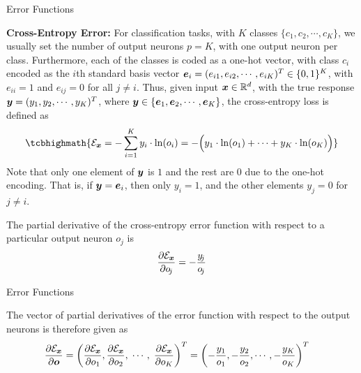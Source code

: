 \begin{frame}{Error Functions}

    {\bf Cross-Entropy Error:} For classification tasks, with $K$
        classes $\{c_1, c_2, \cdots, c_K\}$, we usually set the number
        of output neurons $p=K$, with one output neuron 
        per class. Furthermore, each of
        the classes is coded as a one-hot vector, with class $c_i$
        encoded as the $i$th standard basis vector 
        ${\boldsymbol e}_i  = (e_{i1}, e_{i2}, \cdots, e_{iK})^T \in \{0,1\}^{K}$,
        with $e_{ii}=1$ and $e_{ij} = 0$ for all $j\ne i$. Thus,
        given input ${\boldsymbol x} \in {\mathord{\mathbb R}}^d$, with 
        the true response ${\boldsymbol y} = (y_1,
        y_2, \cdots, y_K)^T$, where ${\boldsymbol y} \in \{{\boldsymbol e}_1, {\boldsymbol e}_2,
        \cdots, {\boldsymbol e}_K\}$, the cross-entropy loss is defined as 
\begin{align}
    \tcbhighmath{
    \cE_\bx = - \sum_{i=1}^K y_i \cdot \ln(o_i) = 
    - \Bigl( y_1 \cdot \ln(o_1) + \cdots 
+ y_K \cdot \ln(o_K) \Bigr) }
            \label{eq:reg:neural:CE}
\end{align}
Note that only one element of ${\boldsymbol y}$ is $1$ and the rest are $0$
due to the one-hot encoding. That is, if ${\boldsymbol y} = {\boldsymbol e}_i$, then only $y_i =
1$, and the other elements $y_j = 0$ for $j \ne i$.

The partial derivative of the cross-entropy error function with
respect to a particular output neuron $o_{\!j}$ is
\begin{align}
    \frac{\partial {\mathcal E}_{\boldsymbol x}}{\partial o_{\!j}} = 
    -\frac{y_{\!j}}{o_{\!j}}
            \label{eq:reg:neural:deriv_CE}
\end{align}
\end{frame}

\begin{frame}{Error Functions}

The vector of partial derivatives of the error function with respect to
the output neurons
is therefore given as
\begin{align}
    \frac{\partial{\mathcal E}_{\boldsymbol x}}{\partial {\boldsymbol o}} & = 
    \left(\frac{\partial {\mathcal E}_{\boldsymbol x}}{\partial o_{1}},
        \frac{\partial {\mathcal E}_{\boldsymbol x}}{\partial o_{2}},
    \;\cdots,\; \frac{\partial {\mathcal E}_{\boldsymbol x}}{\partial o_{K}}\right)^T
     = \left( -\frac{y_1}{o_1}, -\frac{y_2}{o_2}, \cdots, 
             -\frac{y_K}{o_K}
    \right)^T
    \label{eq:reg:neural:pd_ef_o}
\end{align}

\end{frame}

